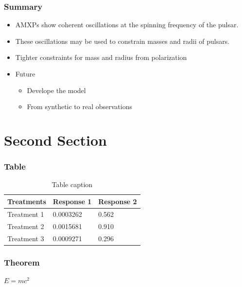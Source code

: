 \documentclass{beamer}
\begin{document}
\begin{frame}
\frametitle{Summary}
\begin{itemize}
\item AMXPs show coherent oscillations at the spinning frequency of the pulsar.
\item These oscillations may be used to constrain masses and radii of pulsars.
\item Tighter constraints for mass and radius from polarization
\item Future
\begin{itemize}
\item Develope the model
\item From synthetic to real observations
\end{itemize} 

\end{itemize}
\end{frame}













\iffalse

\section{Second Section}

\begin{frame}
\frametitle{Table}
\begin{table}
\begin{tabular}{l l l}
\toprule
\textbf{Treatments} & \textbf{Response 1} & \textbf{Response 2}\\
\midrule
Treatment 1 & 0.0003262 & 0.562 \\
Treatment 2 & 0.0015681 & 0.910 \\
Treatment 3 & 0.0009271 & 0.296 \\
\bottomrule
\end{tabular}
\caption{Table caption}
\end{table}
\end{frame}


\begin{frame}
\frametitle{Theorem}
\begin{theorem}
$E = mc^2$
\end{theorem}
\end{frame}
\end{document}
